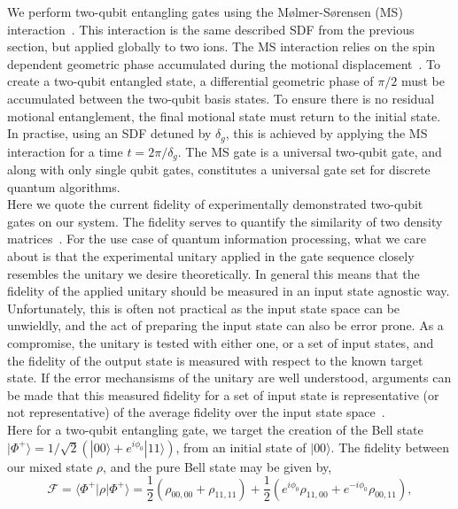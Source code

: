     We perform two-qubit entangling gates using the Mølmer-Sørensen (MS)
    interaction~\cite{}. This interaction is the same described SDF from the
    previous section, but applied globally to two ions. The MS interaction
    relies on the spin dependent geometric phase accumulated during the motional
    displacement~\cite{ozeri_tutorial_2011}. To create a two-qubit entangled state, a differential
    geometric phase of $\pi/2$ must be accumulated between the two-qubit basis
    states. To ensure there is no residual motional entanglement, the final
    motional state must return to the initial state. In practise, using an SDF
    detuned by $\delta_g$, this is achieved by applying the MS interaction for a
    time $t = 2\pi/\delta_g$. The MS gate is a universal two-qubit gate, and
    along with only single qubit gates, constitutes a universal gate set for
    discrete quantum algorithms.\\  
    Here we quote the current fidelity of experimentally demonstrated two-qubit gates on
    our system. The fidelity serves to quantify the similarity of
    two density matrices~\cite{}.  For the use case of quantum information processing, what we
    care about is that the experimental unitary applied in the gate sequence closely resembles the unitary we desire theoretically. In general this
    means that the fidelity of the applied unitary should be measured in an input
    state agnostic way. Unfortunately, this is often not practical as the input
    state space can be unwieldly, and the act of preparing the input state can
    also be error prone. As a compromise, the unitary is tested with either
    one, or a set of input states, and the fidelity of the output state
    is measured with respect to the known target state. If the error mechansisms of the 
    unitary are well understood, arguments can be made that this measured
    fidelity for a set of input state is representative (or not representative)
    of the average fidelity over the input state space~\cite{}.\\
    Here for a two-qubit entangling gate, we target the creation of the Bell
    state $|\Phi^+\rangle = 1/\sqrt{2} \left( |00\rangle +
    e^{i\phi_0}|11\rangle \right)$, from an initial state of $|00\rangle$.
    The fidelity between our mixed state $\rho$, and the pure Bell state may be
    given by,
    \begin{equation}
        \mathcal{F} = \langle \Phi^+ | \rho | \Phi^+ \rangle = \frac{1}{2} \left( \rho_{00,00} + \rho_{11,11} \right) + \frac{1}{2}\left( e^{i\phi_0}\rho_{11,00}+e^{-i\phi_0}\rho_{00,11}\right),
        \label{eq:Fidelity}
    \end{equation}
